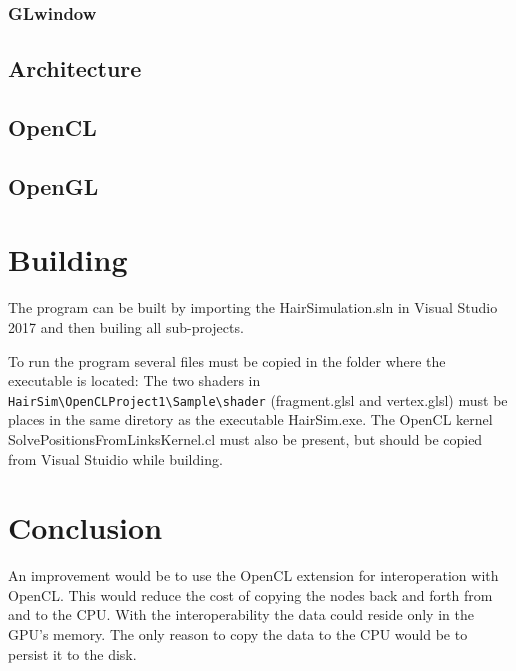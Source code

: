 \documentclass[11pt,a4paper]{scrartcl}
\begin{document}
\subsubsection{GLwindow}



\subsection{Architecture}

\subsection{OpenCL}

\subsection{OpenGL}


\section{Building}
The program can be built by importing the HairSimulation.sln in Visual Studio 2017 and then builing all sub-projects.

To run the program several files must be copied in the folder where the executable is located: The two shaders in \verb|HairSim\OpenCLProject1\Sample\shader| (fragment.glsl and vertex.glsl) must be places in the same diretory as the executable HairSim.exe. The OpenCL kernel SolvePositionsFromLinksKernel.cl must also be present, but should be copied from Visual Stuidio while building.


\section{Conclusion}


An improvement would be to use the OpenCL extension for interoperation with OpenCL. This would reduce the cost of copying the nodes back and forth from and to the CPU. With the interoperability the data could reside only in the GPU's memory. The only reason to copy the data to the CPU would be to persist it to the disk.
\end{document}

